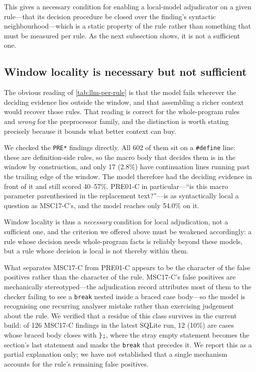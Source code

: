This gives a necessary condition for enabling a local-model
adjudicator on a given rule---that its decision procedure be closed
over the finding's syntactic neighbourhood---which is a static property
of the rule rather than something that must be measured per rule.  As
the next subsection shows, it is not a sufficient one.

\subsection{Window locality is necessary but not sufficient}

The obvious reading of \cref{tab:llm-per-rule} is that the model fails
wherever the deciding evidence lies outside the window, and that
assembling a richer context would recover those rules.  That reading is
correct for the whole-program rules and \emph{wrong} for the
preprocessor family, and the distinction is worth stating precisely
because it bounds what better context can buy.

We checked the \texttt{PRE*} findings directly.  All 602 of them sit on
a \texttt{\#define} line: these are definition-side rules, so the macro
body that decides them is in the window by construction, and only 17
(2.8\%) have continuation lines running past the trailing edge of the
window.  The model therefore had the deciding evidence in front of it
and still scored 40--57\%.  PRE01-C in particular---``is this macro
parameter parenthesised in the replacement text?''---is as syntactically
local a question as MSC17-C's, and the model reaches only 54.0\% on it.

Window locality is thus a \emph{necessary} condition for local
adjudication, not a sufficient one, and the criterion we offered above
must be weakened accordingly: a rule whose decision needs whole-program
facts is reliably beyond these models, but a rule whose decision is
local is not thereby within them.

What separates MSC17-C from PRE01-C appears to be the character of the
false positives rather than the character of the rule.  MSC17-C's false
positives are mechanically stereotyped---the adjudication record
attributes most of them to the checker failing to see a \texttt{break}
nested inside a braced case body---so the model is recognising one
recurring analyser mistake rather than exercising judgement about the
rule.  We verified that a residue of this class survives in the current
build: of 126 MSC17-C findings in the latest SQLite run, 12 (10\%) are
cases whose braced body closes with \texttt{\};}, where the stray empty
statement becomes the section's last statement and masks the
\texttt{break} that precedes it.  We report this as a partial
explanation only; we have not established that a single mechanism
accounts for the rule's remaining false positives.


